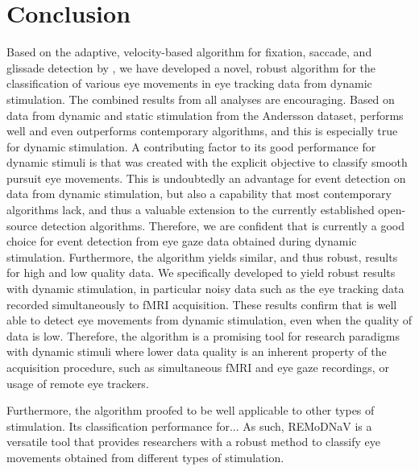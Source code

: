     \section*{Conclusion}\label{con}
    Based on the adaptive, velocity-based algorithm for fixation, saccade, and
    glissade detection by \cite{Nystrom2010AnData}, we have developed a novel,
    robust algorithm for the classification of various eye movements in eye tracking
    data from dynamic stimulation.
    The combined results from all analyses are encouraging. Based on data from dynamic and static stimulation from the
    Andersson dataset, \remodnav performs well and even outperforms contemporary algorithms, and this is especially true
    for dynamic stimulation. A contributing factor to its good performance for dynamic stimuli is that \remodnav was
    created with the explicit objective to classify smooth pursuit eye movements. This is undoubtedly an advantage for
    event detection on data from dynamic stimulation, but also a capability that most contemporary algorithms lack, and
    thus a valuable extension to the currently established open-source detection algorithms. Therefore, we are confident
    that \remodnav is currently a good choice for event detection from eye gaze data obtained during dynamic stimulation.
    Furthermore, the algorithm yields similar, and thus robust, results for high and low quality data. We specifically
    developed \remodnav to yield robust results with dynamic stimulation, in particular noisy data such as the eye
    tracking data recorded simultaneously to fMRI acquisition. These results confirm that \remodnav is well able to detect
    eye movements from dynamic stimulation, even when the quality of data is low. Therefore, the algorithm is a promising
    tool for research paradigms with dynamic stimuli where lower data quality is an inherent property of the acquisition
    procedure, such as simultaneous fMRI and eye gaze recordings, or usage of remote eye trackers.

    Furthermore, the algorithm proofed to be well applicable to other types of stimulation. Its classification performance
    for... 
    As such, REMoDNaV is a versatile tool that provides researchers with a robust
    method to classify eye movements obtained from different types of stimulation.



